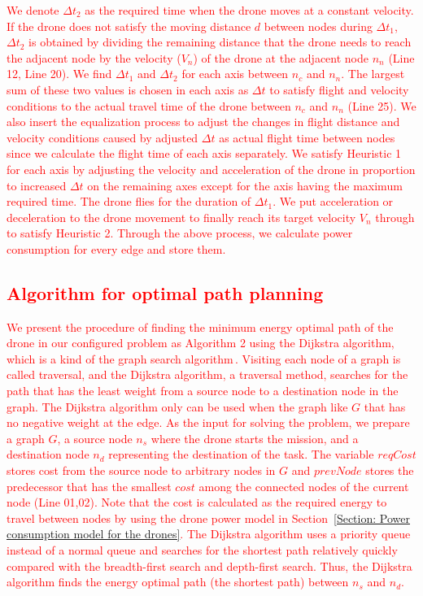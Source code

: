 \documentclass[journal]{./template/IEEEtran}
\begin{document}
\textcolor{red}{
We denote $\Delta t_2$ as the required time when the drone moves at a constant velocity. 
If the drone does not satisfy the moving distance $d$ between nodes during $\Delta t_1$, $\Delta t_2$ is obtained by dividing the remaining distance that the drone needs to reach the adjacent node by the velocity ($V_n$) of the drone at the adjacent node $n_n$ (Line 12, Line 20).
We find $\Delta t_1$ and $\Delta t_2$ for each axis between $n_c$ and $n_n$. The largest sum of these two values is chosen in each axis as $\Delta t$ to satisfy flight and velocity conditions to the actual travel time of the drone between $n_c$ and $n_n$ (Line 25).
We also insert the equalization process to adjust the changes in flight distance and velocity conditions caused by adjusted $\Delta t$ as actual flight time between nodes since we calculate the flight time of each axis separately.
We satisfy Heuristic 1 for each axis by adjusting the velocity and acceleration of the drone in proportion to increased $\Delta t$ on the remaining axes except for the axis having the maximum required time.
The drone flies for the duration of $\Delta t_1$. We put acceleration or deceleration to the drone movement to finally reach its target velocity $V_n$ through to satisfy Heuristic 2.
Through the above process, we calculate power consumption for every edge and store them.
}


\subsection{\textcolor{red}{Algorithm for optimal path planning}}
\textcolor{red}{
We present the procedure of finding the minimum energy optimal path of the drone in our configured problem as
Algorithm 2 using the Dijkstra algorithm, which is a kind of the graph search algorithm\,\cite{ref_19, ref_27}.
Visiting each node of a graph is called traversal, and the Dijkstra algorithm, a traversal method, searches for the path that has the least weight from a source node to a destination node in the graph. The Dijkstra algorithm only can be used when the graph like $G$ that has no negative weight at the edge.
As the input for solving the problem, we prepare a graph $G$, a source node $n_s$ where the drone starts the mission, and a destination node $n_d$ representing the destination of the task.
The variable $reqCost$ stores cost from the source node to arbitrary nodes in $G$ and $prevNode$ stores the predecessor that has the smallest $cost$ among the connected nodes of the current node (Line 01,02). 
Note that the cost is calculated as the required energy to travel between nodes by using the drone power model in Section~\ref{Section: Power consumption model for the drones}.
The Dijkstra algorithm uses a priority queue instead of a normal queue and searches for the shortest path relatively quickly compared with the breadth-first search and depth-first search.
Thus, the Dijkstra algorithm finds the energy optimal path (the shortest path) between $n_s$ and $n_d$.}
\end{document}
